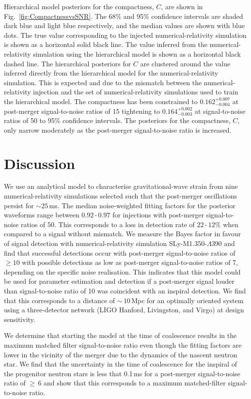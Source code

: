 \documentclass[../Thesis.tex]{subfiles}
\begin{document}
     Hierarchical model posteriors for the compactness, $C$, are shown in Fig.~\ref{fig:CompactnessvsSNR}. 
     The 68\% and 95\% confidence intervals are shaded dark blue and light blue  respectively, and the median values are shown with blue dots.
     The true value corresponding to the injected numerical-relativity simulation is shown as a horizontal solid black line.
     The value inferred from the numerical-relativity simulation using the hierarchical model is shown as a horizontal black dashed line. 
     The hierarchical posteriors for $C$ are clustered around the value inferred directly from the hierarchical model for the numerical-relativity simulation.
     This is expected and due to the mismatch between the numerical-relativity injection and the set of numerical-relativity simulations used to train the hierarchical model.
     The compactness has been constrained to $0.162^{+0.007}_{-0.004}$ at post-merger signal-to-noise ratios of 15 tightening to  $0.164^{+0.002}_{-0.003}$ at signal-to-noise ratios of 50 to 95\% confidence intervals. 
     The posteriors for the compactness, $C$, only narrow moderately as the post-merger signal-to-noise ratio is increased.
 
\section{Discussion}
    We use an analytical model to characterise gravitational-wave strain from nine numerical-relativity simulations selected such that the post-merger oscillations persist for $\sim 25$\,ms. 
    The median noise-weighted fitting factors for the posterior waveforms range between $0.92\,$\nobreakdash-$\,0.97$ for injections with post-merger signal-to-noise ratios of 50. 
    This corresponds to a loss in detection rate of  $22\,$\nobreakdash-$\,12\%$ when compared to a signal without mismatch.
    We measure the Bayes factor in favour of signal detection with numerical-relativity simulation SLy-M1.350-$\Lambda$390 and find that successful detections occur with post-merger signal-to-noise ratios of $\ge 10$ with possible detections as low as  post-merger signal-to-noise ratios of 7, depending on the specific noise realisation. 
    This indicates that this model could be used for parameter estimation and detection if a post-merger signal louder than signal-to-noise ratio of 10 was  coincident with an inspiral detection. 
    We find that this corresponds to a distance of $\sim\,10$\,Mpc for an optimally oriented system using a three-detector network (LIGO Hanford, Livingston, and Virgo) at design sensitivity.
    \par
    We determine that starting the model at the time of coalescence results in the maximum matched filter signal-to-noise ratio even though the fitting factors are lower in the vicinity of the merger due to the dynamics of the nascent neutron star.
    We find that the uncertainty in the time of coalescence for the inspiral of the progenitor neutron stars is less that 0.1\,ms for a post-merger signal-to-noise ratio of $\ge\,6$ and show that this corresponds to a maximum matched-filter signal-to-noise ratio. \par
\end{document}
